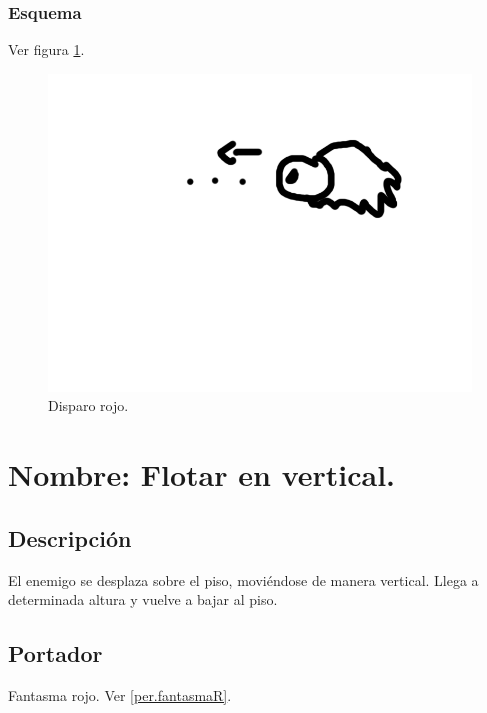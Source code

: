 		\subsubsection{Esquema}
		Ver figura \ref{fig:disparoR}.
		\begin{figure}
			\centering
			\includegraphics[height=0.2 \textheight]{Imagenes/disparoR}
			\caption{Disparo rojo.}
			\label{fig:disparoR}
		\end{figure}
		
	\section{Nombre: Flotar en vertical.} \label{hab.flotarV}
		\subsection{Descripción}
		El enemigo se desplaza sobre el piso, moviéndose de manera vertical. Llega a determinada altura y vuelve a bajar al piso.
		\subsection{Portador}
		Fantasma rojo. Ver \ref{per.fantasmaR}.
